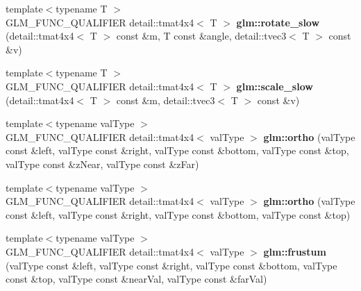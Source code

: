 \begin{DoxyCompactItemize}
\item 
\hypertarget{namespaceglm_ac9cf508a8aafbe789407ceedc8bba577}{{\footnotesize template$<$typename T $>$ }\\\-G\-L\-M\-\_\-\-F\-U\-N\-C\-\_\-\-Q\-U\-A\-L\-I\-F\-I\-E\-R \*
detail\-::tmat4x4$<$ \-T $>$ {\bfseries glm\-::rotate\-\_\-slow} (detail\-::tmat4x4$<$ \-T $>$ const \&m, \-T const \&angle, detail\-::tvec3$<$ \-T $>$ const \&v)}\label{namespaceglm_ac9cf508a8aafbe789407ceedc8bba577}

\item 
\hypertarget{namespaceglm_a76d77fa87fa61d2f5fe7d103d13fb8da}{{\footnotesize template$<$typename T $>$ }\\\-G\-L\-M\-\_\-\-F\-U\-N\-C\-\_\-\-Q\-U\-A\-L\-I\-F\-I\-E\-R \*
detail\-::tmat4x4$<$ \-T $>$ {\bfseries glm\-::scale\-\_\-slow} (detail\-::tmat4x4$<$ \-T $>$ const \&m, detail\-::tvec3$<$ \-T $>$ const \&v)}\label{namespaceglm_a76d77fa87fa61d2f5fe7d103d13fb8da}

\item 
\hypertarget{namespaceglm_acc52ed471fb6f5c9ba9c548c0f2e818e}{{\footnotesize template$<$typename val\-Type $>$ }\\\-G\-L\-M\-\_\-\-F\-U\-N\-C\-\_\-\-Q\-U\-A\-L\-I\-F\-I\-E\-R \*
detail\-::tmat4x4$<$ val\-Type $>$ {\bfseries glm\-::ortho} (val\-Type const \&left, val\-Type const \&right, val\-Type const \&bottom, val\-Type const \&top, val\-Type const \&z\-Near, val\-Type const \&z\-Far)}\label{namespaceglm_acc52ed471fb6f5c9ba9c548c0f2e818e}

\item 
\hypertarget{namespaceglm_a3add8e024acb8ca1151c68e03bbb0c1c}{{\footnotesize template$<$typename val\-Type $>$ }\\\-G\-L\-M\-\_\-\-F\-U\-N\-C\-\_\-\-Q\-U\-A\-L\-I\-F\-I\-E\-R \*
detail\-::tmat4x4$<$ val\-Type $>$ {\bfseries glm\-::ortho} (val\-Type const \&left, val\-Type const \&right, val\-Type const \&bottom, val\-Type const \&top)}\label{namespaceglm_a3add8e024acb8ca1151c68e03bbb0c1c}

\item 
\hypertarget{namespaceglm_a8baf5656c3afcb2e3ebcc34c542610a4}{{\footnotesize template$<$typename val\-Type $>$ }\\\-G\-L\-M\-\_\-\-F\-U\-N\-C\-\_\-\-Q\-U\-A\-L\-I\-F\-I\-E\-R \*
detail\-::tmat4x4$<$ val\-Type $>$ {\bfseries glm\-::frustum} (val\-Type const \&left, val\-Type const \&right, val\-Type const \&bottom, val\-Type const \&top, val\-Type const \&near\-Val, val\-Type const \&far\-Val)}\label{namespaceglm_a8baf5656c3afcb2e3ebcc34c542610a4}


\end{DoxyCompactItemize}
